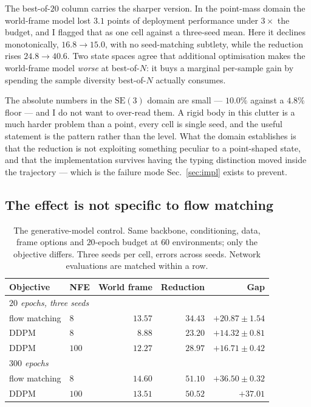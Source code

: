 \documentclass[11pt,a4paper]{article}
\newcommand{\toprule}{\hline}
\newcommand{\midrule}{\hline}
\newcommand{\bottomrule}{\hline}
\newcommand{\SE}{\mathrm{SE}(3)}
\begin{document}
The best-of-$20$ column carries the sharper version. In the point-mass domain the
world-frame model lost $3.1$ points of deployment performance under $3\times$ the
budget, and I flagged that as one cell against a three-seed mean. Here it declines
monotonically, $16.8 \to 15.0$, with no seed-matching subtlety, while the
reduction rises $24.8 \to 40.6$. Two state spaces agree that additional
optimisation makes the world-frame model \emph{worse} at best-of-$N$: it buys a
marginal per-sample gain by spending the sample diversity best-of-$N$ actually
consumes.

The absolute numbers in the $\SE$ domain are small --- $10.0\%$ against a $4.8\%$
floor --- and I do not want to over-read them. A rigid body in this clutter is a
much harder problem than a point, every cell is single seed, and the useful
statement is the pattern rather than the level. What the domain establishes is
that the reduction is not exploiting something peculiar to a point-shaped state,
and that the implementation survives having the typing distinction moved inside
the trajectory --- which is the failure mode Sec.~\ref{sec:impl} exists to
prevent.

\subsection{The effect is not specific to flow matching}
\label{sec:objective}

\begin{table}[t]
\centering
\begin{tabular}{llrrr}
\toprule
Objective & NFE & World frame & Reduction & Gap \\
\midrule
\multicolumn{5}{l}{\emph{$20$ epochs, three seeds}}\\
flow matching & $8$   & $13.57$ & $34.43$ & $+20.87 \pm 1.54$ \\
DDPM          & $8$   & $8.88$  & $23.20$ & $+14.32 \pm 0.81$ \\
DDPM          & $100$ & $12.27$ & $28.97$ & $+16.71 \pm 0.42$ \\[3pt]
\multicolumn{5}{l}{\emph{$300$ epochs}}\\
flow matching & $8$   & $14.60$ & $51.10$ & $\mathbf{+36.50 \pm 0.32}$ \\
DDPM          & $100$ & $13.51$ & $50.52$ & $\mathbf{+37.01}$ \\
\bottomrule
\end{tabular}
\caption{The generative-model control. Same backbone, conditioning, data, frame
options and $20$-epoch budget at $60$ environments; only the objective differs.
Three seeds per cell, errors across seeds. Network evaluations are matched within
a row.}
\label{tab:objective}
\end{table}
\end{document}
